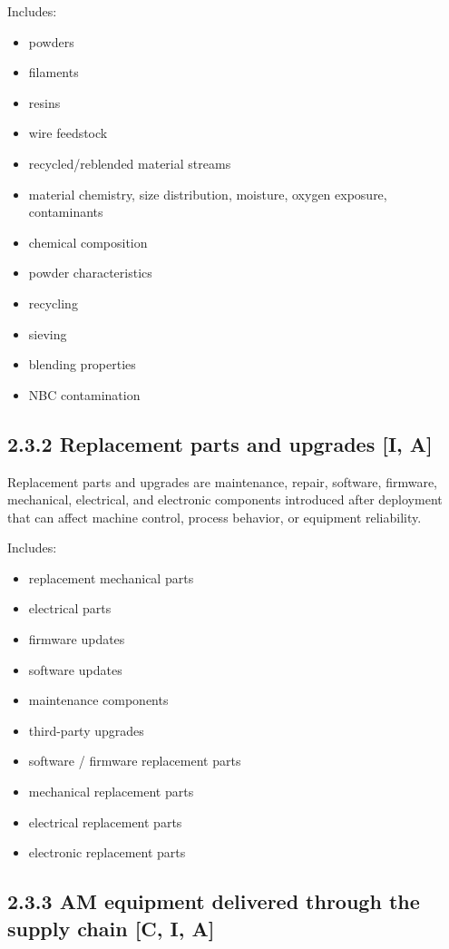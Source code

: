 \documentclass[10pt,a4paper,oneside]{report}
\begin{document}
Includes:

\begin{itemize}
\item powders
\item filaments
\item resins
\item wire feedstock
\item recycled/reblended material streams
\item material chemistry, size distribution, moisture, oxygen exposure, contaminants
\item chemical composition
\item powder characteristics
\item recycling
\item sieving
\item blending properties
\item NBC contamination
\end{itemize}


\subsection{2.3.2 Replacement parts and upgrades [I, A]}


Replacement parts and upgrades are maintenance, repair, software, firmware, mechanical, electrical, and electronic components introduced after deployment that can affect machine control, process behavior, or equipment reliability.

Includes:

\begin{itemize}
\item replacement mechanical parts
\item electrical parts
\item firmware updates
\item software updates
\item maintenance components
\item third-party upgrades
\item software / firmware replacement parts
\item mechanical replacement parts
\item electrical replacement parts
\item electronic replacement parts
\end{itemize}


\subsection{2.3.3 AM equipment delivered through the supply chain [C, I, A]}
\end{document}

